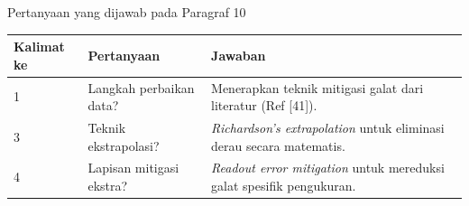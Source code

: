 \begin{frame}{Pertanyaan yang dijawab pada Paragraf 10}
    \centering
    \small
    \begin{tabular}{lp{4.5cm}p{6cm}}
        \toprule
        Kalimat ke & Pertanyaan & Jawaban \\
        \midrule
        1 & Langkah perbaikan data? & Menerapkan teknik mitigasi galat dari literatur (Ref [41]). \\
        3 & Teknik ekstrapolasi? & \textit{Richardson's extrapolation} untuk eliminasi derau secara matematis. \\
        4 & Lapisan mitigasi ekstra? & \textit{Readout error mitigation} untuk mereduksi galat spesifik pengukuran. \\
        \bottomrule
    \end{tabular}
\end{frame}
